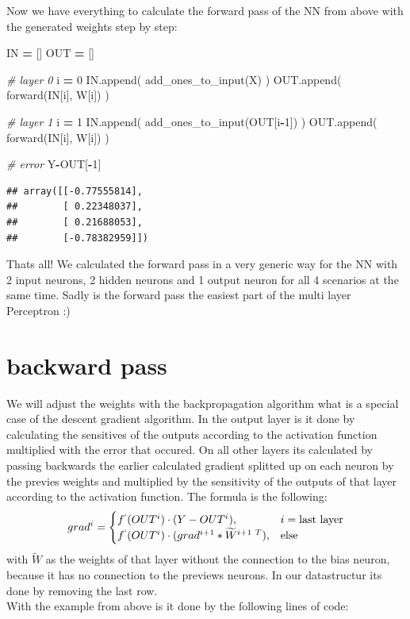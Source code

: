 \documentclass[
]{book}
\newenvironment{Shaded}{\begin{snugshade}}{\end{snugshade}}
\newcommand{\CommentTok}[1]{\textcolor[rgb]{0.56,0.35,0.01}{\textit{#1}}}
\newcommand{\DecValTok}[1]{\textcolor[rgb]{0.00,0.00,0.81}{#1}}
\newcommand{\NormalTok}[1]{#1}
\newcommand{\OperatorTok}[1]{\textcolor[rgb]{0.81,0.36,0.00}{\textbf{#1}}}
\begin{document}
Now we have everything to calculate the forward pass of the NN from above with the generated weights step by step:

\begin{Shaded}
\begin{Highlighting}[]
\NormalTok{IN }\OperatorTok{=}\NormalTok{ []}
\NormalTok{OUT }\OperatorTok{=}\NormalTok{ []}

\CommentTok{\# layer 0}
\NormalTok{i }\OperatorTok{=} \DecValTok{0}
\NormalTok{IN.append( add\_ones\_to\_input(X) )}
\NormalTok{OUT.append( forward(IN[i], W[i]) )}

\CommentTok{\# layer 1}
\NormalTok{i }\OperatorTok{=} \DecValTok{1}
\NormalTok{IN.append( add\_ones\_to\_input(OUT[i}\OperatorTok{{-}}\DecValTok{1}\NormalTok{]) )}
\NormalTok{OUT.append( forward(IN[i], W[i]) )}

\CommentTok{\# error}
\NormalTok{Y}\OperatorTok{{-}}\NormalTok{OUT[}\OperatorTok{{-}}\DecValTok{1}\NormalTok{]}
\end{Highlighting}
\end{Shaded}

\begin{verbatim}
## array([[-0.77555814],
##        [ 0.22348037],
##        [ 0.21688053],
##        [-0.78382959]])
\end{verbatim}

Thats all! We calculated the forward pass in a very generic way for the NN with 2 input neurons, 2 hidden neurons and 1 output neuron for all 4 scenarios at the same time. Sadly is the forward pass the easiest part of the multi layer Perceptron :)

\hypertarget{backward-pass-1}{%
\section{backward pass}\label{backward-pass-1}}

We will adjust the weights with the backpropagation algorithm what is a special case of the descent gradient algorithm. In the output layer is it done by calculating the sensitives of the outputs according to the activation function multiplied with the error that occured. On all other layers its calculated by passing backwards the earlier calculated gradient splitted up on each neuron by the previes weights and multiplied by the sensitivity of the outputs of that layer according to the activation function. The formula is the following:
\[
  grad^i= 
\begin{cases}
    f^`(OUT^i) \cdot (Y-OUT^i),& i =\text{last layer}\\
    f^`(OUT^i) \cdot (grad^{i+1} * \widetilde{W}^{i+1\ T}),& \text{else}
\end{cases}
\]
with \(\widetilde{W}\) as the weights of that layer without the connection to the bias neuron, because it has no connection to the previews neurons. In our datastructur its done by removing the last row.\\
With the example from above is it done by the following lines of code:
\end{document}

